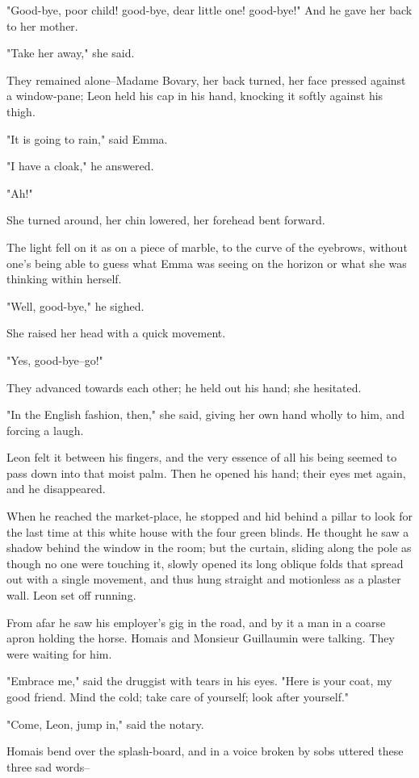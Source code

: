 \documentclass{tufte-book}
\begin{document}
"Good-bye, poor child! good-bye, dear little one! good-bye!" And he gave
her back to her mother.

"Take her away," she said.

They remained alone--Madame Bovary, her back turned, her face pressed
against a window-pane; Leon held his cap in his hand, knocking it softly
against his thigh.

"It is going to rain," said Emma.

"I have a cloak," he answered.

"Ah!"

She turned around, her chin lowered, her forehead bent forward.

The light fell on it as on a piece of marble, to the curve of the
eyebrows, without one's being able to guess what Emma was seeing on the
horizon or what she was thinking within herself.

"Well, good-bye," he sighed.

She raised her head with a quick movement.

"Yes, good-bye--go!"

They advanced towards each other; he held out his hand; she hesitated.

"In the English fashion, then," she said, giving her own hand wholly to
him, and forcing a laugh.

Leon felt it between his fingers, and the very essence of all his being
seemed to pass down into that moist palm. Then he opened his hand; their
eyes met again, and he disappeared.

When he reached the market-place, he stopped and hid behind a pillar to
look for the last time at this white house with the four green blinds.
He thought he saw a shadow behind the window in the room; but the
curtain, sliding along the pole as though no one were touching it,
slowly opened its long oblique folds that spread out with a single
movement, and thus hung straight and motionless as a plaster wall. Leon
set off running.

From afar he saw his employer's gig in the road, and by it a man in
a coarse apron holding the horse. Homais and Monsieur Guillaumin were
talking. They were waiting for him.

"Embrace me," said the druggist with tears in his eyes. "Here is your
coat, my good friend. Mind the cold; take care of yourself; look after
yourself."

"Come, Leon, jump in," said the notary.

Homais bend over the splash-board, and in a voice broken by sobs uttered
these three sad words--
\end{document}
